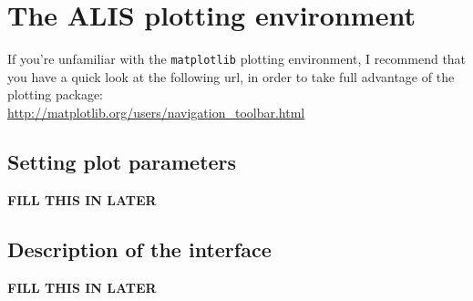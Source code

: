 \section{The ALIS plotting environment}
\label{sec:plotting}

If you're unfamiliar with the \texttt{matplotlib} plotting environment,
I recommend that you have a quick look at the following url, in order
to take full advantage of the plotting package:\\
\url{http://matplotlib.org/users/navigation\_toolbar.html}

\subsection{Setting plot parameters}

\textbf{FILL THIS IN LATER}

\subsection{Description of the interface}

\textbf{FILL THIS IN LATER}